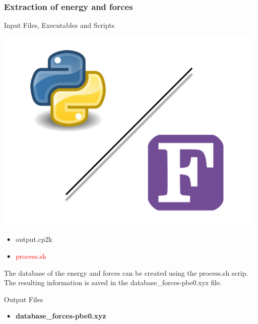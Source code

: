 \documentclass[12pt]{article}
\begin{document}
\subsubsection{Extraction of energy and forces}
\begin{mybox2}{{Input Files, Executables and Scripts}}
\begin{minipage}[c]{0.5\linewidth}
\includegraphics[scale=0.1]{latex_files/Python-fortran.jpeg}
\end{minipage}
\begin{minipage}[c]{0.5\linewidth}
\begin{itemize}
    \item output.cp2k
  \item \textcolor{red}{process.sh}
\end{itemize}
\end{minipage}
\end{mybox2}
The database of the energy and forces can be created using the process.sh scrip. The resulting information is saved in the database\_forces-pbe0.xyz file.
\\
\begin{mybox3}{Output Files}
\begin{itemize}
    \item \textbf{database\_forces-pbe0.xyz}
\end{itemize}
\end{mybox3}
%
\end{document}
